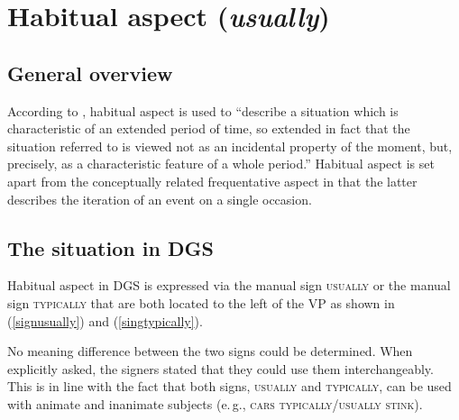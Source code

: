 \section{Habitual aspect (\textit{usually})}\label{habitualaspect}
\subsection{General overview}
According to \citet[28]{comrie1976aspect}, habitual aspect is used to ``describe a situation which is characteristic of an extended period of time, so extended in fact that the situation referred to is viewed not as an incidental property of the moment, but, precisely, as a characteristic feature of a whole period.'' Habitual aspect is set apart from the conceptually related frequentative aspect in that the latter describes the iteration of an event on a single occasion. 



\subsection{The situation in DGS}
Habitual aspect in DGS is expressed via the manual sign \textsc{usually} or the manual sign \textsc{typically} that are both located to the left of the VP as shown in (\ref{signusually}) and (\ref{singtypically}).

\begin{exe}
\ex\label{signusually}\begin{xlist} 
\end{xlist}
\end{exe} 


\begin{exe}
\ex\label{singtypically}\begin{xlist} 
\end{xlist}
\end{exe} 

\noindent No meaning difference between the two signs could be determined. When explicitly asked, the signers stated that they could use them interchangeably. This is in line with the fact that both signs, \textsc{usually} and \textsc{typically}, can be used with animate and inanimate subjects (e.\,g., \textsc{cars typically/usually stink}). 

